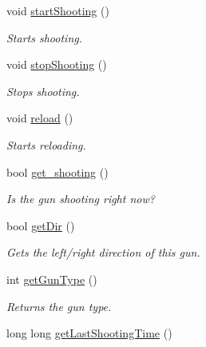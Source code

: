 \begin{DoxyCompactItemize}
\mbox{\label{class_gun_a9f2556ef49d9c281f36e8146d93c874f}} 
void \mbox{\hyperlink{class_gun_a9f2556ef49d9c281f36e8146d93c874f}{start\+Shooting}} ()
\begin{DoxyCompactList}\small\item\em Starts shooting. \end{DoxyCompactList}\item 
\mbox{\label{class_gun_a7aab1143227469e4a4e612ab6cf1085b}} 
void \mbox{\hyperlink{class_gun_a7aab1143227469e4a4e612ab6cf1085b}{stop\+Shooting}} ()
\begin{DoxyCompactList}\small\item\em Stops shooting. \end{DoxyCompactList}\item 
\mbox{\label{class_gun_a0390123e1970d903a81114ecde42728c}} 
void \mbox{\hyperlink{class_gun_a0390123e1970d903a81114ecde42728c}{reload}} ()
\begin{DoxyCompactList}\small\item\em Starts reloading. \end{DoxyCompactList}\item 
\mbox{\label{class_gun_a59b3a1f50d00f5b0a70c35b5625d6bab}} 
bool \mbox{\hyperlink{class_gun_a59b3a1f50d00f5b0a70c35b5625d6bab}{get\+\_\+shooting}} ()
\begin{DoxyCompactList}\small\item\em Is the gun shooting right now? \end{DoxyCompactList}\item 
\mbox{\label{class_gun_a8a5ac356c3bbe96cc529ce2995664d71}} 
bool \mbox{\hyperlink{class_gun_a8a5ac356c3bbe96cc529ce2995664d71}{get\+Dir}} ()
\begin{DoxyCompactList}\small\item\em Gets the left/right direction of this gun. \end{DoxyCompactList}\item 
int \mbox{\hyperlink{class_gun_a3d411e267b0879db941feb0b47169103}{get\+Gun\+Type}} ()
\begin{DoxyCompactList}\small\item\em Returns the gun type. \end{DoxyCompactList}\item 
long long \mbox{\hyperlink{class_gun_ac23d10133e36fe70dfdf37e411a698e6}{get\+Last\+Shooting\+Time}} ()

\end{DoxyCompactItemize}
